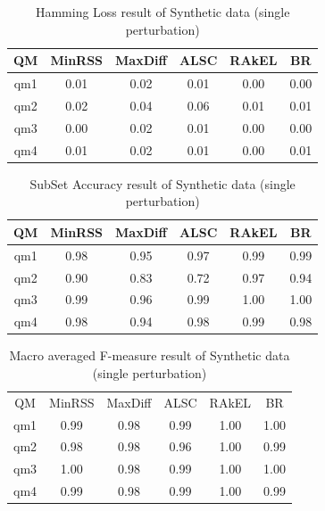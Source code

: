 \documentclass[runningheads,a4paper]{llncs}
\begin{document}
\begin {table}[h]
\scriptsize
\centering
\begin{tabular}{c|c|c|c|c|c}	
	\hline\hline	
QM & MinRSS & MaxDiff & ALSC & RAkEL & BR   \\ \hline
qm1 & 0.01 & 0.02 & 0.01 & 0.00 & 0.00 \\
qm2 & 0.02 & 0.04 & 0.06 & 0.01 & 0.01  \\
qm3 & 0.00 & 0.02 & 0.01 & 0.00 & 0.00   \\
qm4 & 0.01 & 0.02 & 0.01 & 0.00 & 0.01  \\  \hline\hline
\end{tabular}
\caption {Hamming Loss result of Synthetic data (single perturbation)} \label{ref:Syn_HL} 
\end{table}




\begin {table}[h]
\scriptsize
\centering
\begin{tabular}{c|c|c|c|c|c}	
	\hline\hline	
QM  & MinRSS  & MaxDiff  & ALSC  & RAkEL & BR    \\  \hline
qm1  & 0.98 & 0.95 & 0.97 & 0.99 & 0.99  \\
qm2  & 0.90 & 0.83 & 0.72 & 0.97 & 0.94  \\
qm3  & 0.99 & 0.96 & 0.99 & 1.00 & 1.00  \\
qm4  & 0.98 &  0.94 & 0.98 & 0.99 & 0.98  \\
\hline\hline
\end{tabular}
\caption {SubSet Accuracy result of Synthetic data (single perturbation)} \label{ref:Syn_SA} 
\end{table}



\begin {table}[h]
\scriptsize
\centering
\begin{tabular}{c|c|c|c|c|c}	
	\hline\hline	
 QM  &  MinRSS & MaxDiff  &  ALSC  &  RAkEL &  BR  \\ 
 qm1  & 0.99 & 0.98 & 0.99 & 1.00 & 1.00  \\  
 qm2  & 0.98 & 0.98 & 0.96 & 1.00 & 0.99  \\
 qm3  & 1.00 & 0.98 & 0.99 & 1.00 & 1.00  \\
 qm4  & 0.99 & 0.98 & 0.99 & 1.00 & 0.99  \\
\hline\hline
\end{tabular}
\caption {Macro averaged F-measure result of Synthetic data (single perturbation)} \label{ref:Syn_FM} 
\end{table}
\end{document}
